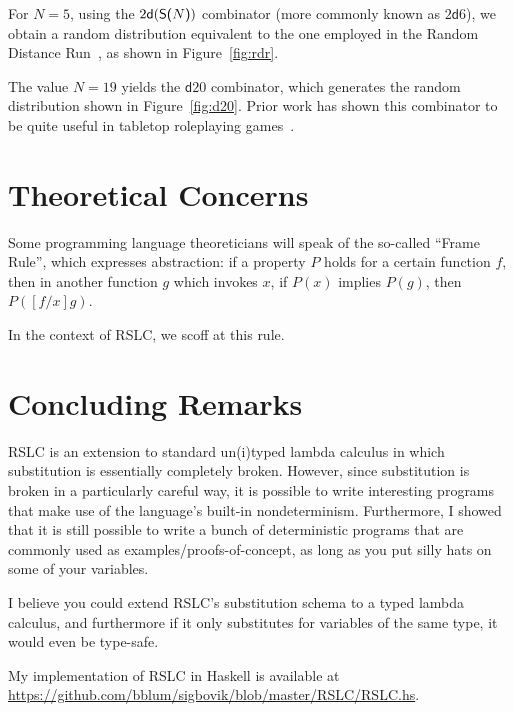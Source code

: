 \documentclass[10pt]{sigplanconf}
\begin{document}
For $N = 5$, using the $2\mathsf{d}(\textsf{S(}N\textsf{)})$ combinator (more commonly known as $2\mathsf{d}6$), we obtain a random distribution equivalent to the one employed in the Random Distance Run~\cite{rdr}, as shown in Figure~\ref{fig:rdr}.

The value $N = 19$ yields the $\mathsf{d}20$ combinator, which generates the random distribution shown in Figure~\ref{fig:d20}. Prior work has shown this combinator to be quite useful in tabletop roleplaying games~\cite{dnd-mm,dnd-phb,dnd-dmg}.

\section{Theoretical Concerns}

Some programming language theoreticians will speak of the so-called ``Frame Rule'', which expresses abstraction: if a property $P$ holds for a certain function $f$, then in another function $g$ which invokes $x$, if $P(x)$ implies $P(g)$, then $P([f/x]g)$.

In the context of RSLC, we scoff at this rule.

\section{Concluding Remarks}

RSLC is an extension to standard un(i)typed lambda calculus in which substitution is essentially completely broken. However, since substitution is broken in a particularly careful way, it is possible to write interesting programs that make use of the language's built-in nondeterminism.
Furthermore, I showed that it is still possible to write a bunch of deterministic programs that are commonly used as examples/proofs-of-concept, as long as you put silly hats on some of your variables.

I believe you could extend RSLC's substitution schema to a typed lambda calculus, and furthermore if it only substitutes for variables of the same type, it would even be type-safe.

My implementation of RSLC in Haskell is available at \url{https://github.com/bblum/sigbovik/blob/master/RSLC/RSLC.hs}.




\newpage

\appendix
\end{document}
